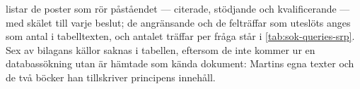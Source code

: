  listar de poster som rör påståendet --- citerade,
stödjande och kvalificerande --- med skälet till varje beslut; de
angränsande och de felträffar som uteslöts anges som antal i
tabelltexten, och antalet träffar per fråga står i
\cref{tab:sok-queries-srp}.  Sex av bilagans källor saknas i tabellen,
eftersom de inte kommer ur en databassökning utan är hämtade som kända
dokument: Martins egna texter och de två böcker han tillskriver
principens innehåll.
